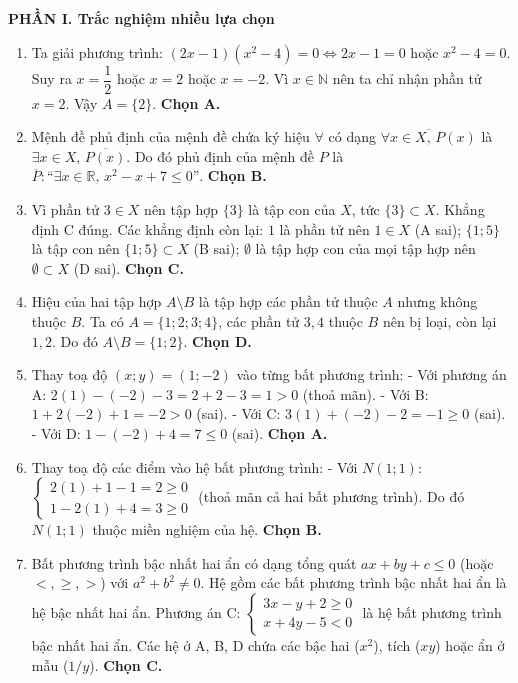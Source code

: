 \documentclass[12pt,a4paper]{article}
\begin{document}
\textbf{\large PHẦN I. Trắc nghiệm nhiều lựa chọn}
\begin{enumerate}
\item Ta giải phương trình: $(2x - 1)(x^2 - 4) = 0 \iff 2x - 1 = 0$ hoặc $x^2 - 4 = 0$.
Suy ra $x = \dfrac{1}{2}$ hoặc $x = 2$ hoặc $x = -2$.
Vì $x \in \mathbb{N}$ nên ta chỉ nhận phần tử $x = 2$. Vậy $A = \{2\}$. \textbf{Chọn A.}

\item Mệnh đề phủ định của mệnh đề chứa ký hiệu $\forall$ có dạng $\overline{\forall x \in X,\, P(x)}$ là $\exists x \in X,\, \overline{P(x)}$.
Do đó phủ định của mệnh đề $P$ là $\overline{P}\colon \text{``}\exists x \in \mathbb{R},\, x^2 - x + 7 \le 0\text{''}$. \textbf{Chọn B.}

\item Vì phần tử $3 \in X$ nên tập hợp $\{3\}$ là tập con của $X$, tức $\{3\} \subset X$. Khẳng định C đúng.
Các khẳng định còn lại: $1$ là phần tử nên $1 \in X$ (A sai); $\{1; 5\}$ là tập con nên $\{1; 5\} \subset X$ (B sai); $\emptyset$ là tập hợp con của mọi tập hợp nên $\emptyset \subset X$ (D sai). \textbf{Chọn C.}

\item Hiệu của hai tập hợp $A \setminus B$ là tập hợp các phần tử thuộc $A$ nhưng không thuộc $B$.
Ta có $A = \{1; 2; 3; 4\}$, các phần tử $3, 4$ thuộc $B$ nên bị loại, còn lại $1, 2$. Do đó $A \setminus B = \{1; 2\}$. \textbf{Chọn D.}

\item Thay toạ độ $(x; y) = (1; -2)$ vào từng bất phương trình:
- Với phương án A: $2(1) - (-2) - 3 = 2 + 2 - 3 = 1 > 0$ (thoả mãn).
- Với B: $1 + 2(-2) + 1 = -2 > 0$ (sai).
- Với C: $3(1) + (-2) - 2 = -1 \ge 0$ (sai).
- Với D: $1 - (-2) + 4 = 7 \le 0$ (sai). \textbf{Chọn A.}

\item Thay toạ độ các điểm vào hệ bất phương trình:
- Với $N(1; 1)$: $\begin{cases} 2(1) + 1 - 1 = 2 \ge 0 \\ 1 - 2(1) + 4 = 3 \ge 0 \end{cases}$ (thoả mãn cả hai bất phương trình). Do đó $N(1; 1)$ thuộc miền nghiệm của hệ. \textbf{Chọn B.}

\item Bất phương trình bậc nhất hai ẩn có dạng tổng quát $ax + by + c \le 0$ (hoặc $<, \ge, >$) với $a^2 + b^2 \ne 0$. Hệ gồm các bất phương trình bậc nhất hai ẩn là hệ bậc nhất hai ẩn.
Phương án C: $\begin{cases} 3x - y + 2 \ge 0 \\ x + 4y - 5 < 0 \end{cases}$ là hệ bất phương trình bậc nhất hai ẩn. Các hệ ở A, B, D chứa các bậc hai ($x^2$), tích ($xy$) hoặc ẩn ở mẫu ($1/y$). \textbf{Chọn C.}


\end{enumerate}
\end{document}
